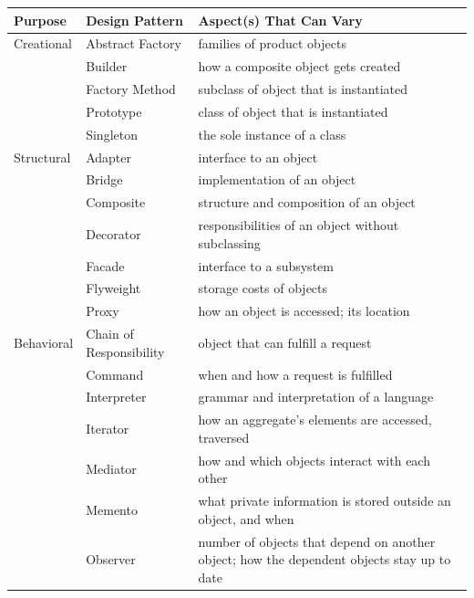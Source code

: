 \documentclass{report}
\begin{document}
\begin{itemize}
\begin{center}
\begin{tabularx}{\textwidth}{@{}llX@{}}
                    \toprule
                    \textbf{Purpose}& \textbf{Design Pattern} &\textbf{Aspect(s) That Can Vary} \\
                    \midrule
                    Creational & Abstract Factory  &families of product objects\\[2ex]
                               &Builder  &how a composite object gets created\\[2ex]
                               &Factory Method  &subclass of object that is instantiated\\[2ex]
                               &Prototype  &class of object that is instantiated\\[2ex]
                               &Singleton  &the sole instance of a class\\[2ex]
                    Structural &Adapter  &interface to an object\\[2ex]
                               &Bridge  &implementation of an object\\[2ex]
                               &Composite  &structure and composition of an object\\[2ex]
                               &Decorator  &responsibilities of an object without subclassing\\[2ex]
                               &Facade  &interface to a subsystem\\[2ex]
                               &Flyweight  &storage costs of objects\\[2ex]
                               &Proxy  &how an object is accessed; its location\\[2ex]
                    Behavioral &Chain of Responsibility &object that can fulfill a request\\[2ex]
                               &Command  &when and how a request is fulfilled\\[2ex]
                               &Interpreter  &grammar and interpretation of a language\\[2ex]
                               &Iterator  &how an aggregate's elements are accessed, traversed\\[2ex]
                               &Mediator  &how and which objects interact with each other\\[2ex]
                               &Memento  &what private information is stored outside an object, and when\\[2ex]
                               &Observer & number of objects that depend on another object; how the dependent objects stay up to date\\[2ex]

\end{tabularx}
\end{center}
\end{itemize}
\end{document}
